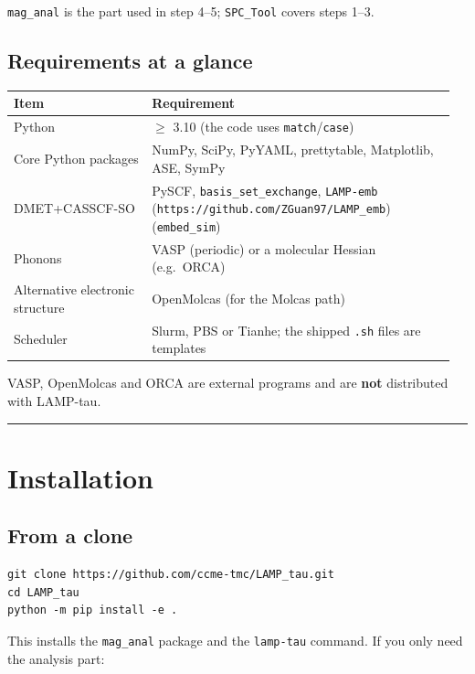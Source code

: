 \documentclass[11pt,a4paper]{article}
\begin{document}
\texttt{mag\_anal} is the part used in step 4--5; \texttt{SPC\_Tool}
covers steps 1--3.

\subsection{Requirements at a
glance}\label{requirements-at-a-glance}

\begin{longtable}[]{@{}>{\raggedright\arraybackslash}p{0.30\linewidth} >{\raggedright\arraybackslash}p{0.66\linewidth}@{}}
\toprule
Item\strut
 & Requirement\strut
\tabularnewline
\midrule
\endhead
Python\strut
 & \(\geq\) 3.10 (the code uses \texttt{match}/\texttt{case})\strut
\tabularnewline
Core Python packages\strut
 & NumPy, SciPy, PyYAML, prettytable, Matplotlib, ASE, SymPy\strut
\tabularnewline
DMET+CASSCF-SO\strut
 & PySCF, \texttt{basis\_set\_exchange},
\texttt{LAMP-emb} (\texttt{https://github.com/ZGuan97/LAMP\_emb})
(\texttt{embed\_sim})\strut
\tabularnewline
Phonons\strut
 & VASP (periodic) or a molecular Hessian (e.g.~ORCA)\strut
\tabularnewline
Alternative electronic structure\strut
 & OpenMolcas (for the Molcas path)\strut
\tabularnewline
Scheduler\strut
 & Slurm, PBS or Tianhe; the shipped \texttt{.sh} files are templates\strut
\tabularnewline
\bottomrule
\end{longtable}

VASP, OpenMolcas and ORCA are external programs and are \textbf{not}
distributed with LAMP-tau.

\begin{center}\rule{0.5\linewidth}{0.4pt}\end{center}

\section{Installation}\label{installation}

\subsection{From a clone}\label{from-a-clone}

\begin{lstlisting}
git clone https://github.com/ccme-tmc/LAMP_tau.git
cd LAMP_tau
python -m pip install -e .
\end{lstlisting}

This installs the \texttt{mag\_anal} package and the \texttt{lamp-tau}
command. If you only need the analysis part:
\end{document}
